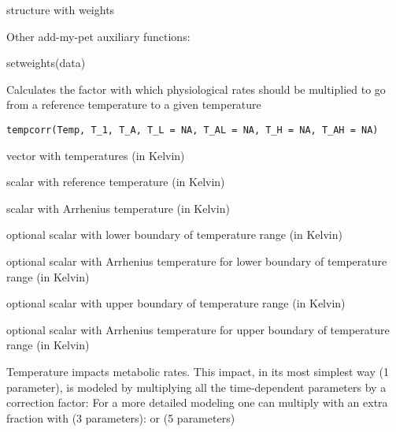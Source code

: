 \documentclass[a4paper]{book}
\begin{document}
%
\begin{Value}
structure with weights
\end{Value}
%
\begin{SeeAlso}\relax
Other add-my-pet auxiliary functions: 
\end{SeeAlso}
%
\begin{Examples}
\begin{ExampleCode}
setweights(data)
\end{ExampleCode}
\end{Examples}
%
\begin{Description}\relax
Calculates the factor with which physiological rates should be multiplied to go from a reference temperature to a given temperature
\end{Description}
%
\begin{Usage}
\begin{verbatim}
tempcorr(Temp, T_1, T_A, T_L = NA, T_AL = NA, T_H = NA, T_AH = NA)
\end{verbatim}
\end{Usage}
%
\begin{Arguments}
\begin{ldescription}
\item[\code{Temp}] vector with temperatures (in Kelvin)

\item[\code{T\_1}] scalar with reference temperature (in Kelvin)

\item[\code{T\_A}] scalar with Arrhenius temperature (in Kelvin)

\item[\code{T\_L}] optional scalar with lower boundary of temperature range (in Kelvin)

\item[\code{T\_AL}] optional scalar with Arrhenius temperature for lower boundary of temperature range (in Kelvin)

\item[\code{T\_H}] optional scalar with upper boundary of temperature range (in Kelvin)

\item[\code{T\_AH}] optional scalar with Arrhenius temperature for upper boundary of temperature range (in Kelvin)
\end{ldescription}
\end{Arguments}
%
\begin{Details}\relax
Temperature impacts metabolic rates. This impact, in its most simplest way (1 parameter), is modeled by multiplying all the time-dependent parameters by a correction factor:
For a more detailed modeling one can multiply with an extra fraction  with (3 parameters):
or (5 parameters)
\end{Details}
\end{document}
